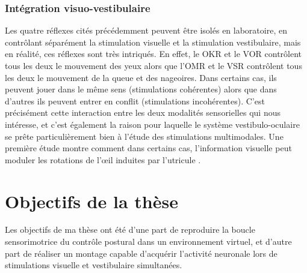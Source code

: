 \subsubsection{Intégration visuo-vestibulaire}

Les quatre réflexes cités précédemment peuvent être isolés en laboratoire, en contrôlant séparément la stimulation visuelle et la stimulation vestibulaire, mais en réalité, ces réflexes sont très intriqués. En effet, le OKR et le VOR contrôlent tous les deux le mouvement des yeux alors que l'OMR et le VSR contrôlent tous les deux le mouvement de la queue et des nageoires. Dans certains cas, ils peuvent jouer dans le même sens (stimulations cohérentes) alors que dans d'autres ils peuvent entrer en conflit (stimulations incohérentes). C'est précisément cette interaction entre les deux modalités sensorielles qui nous intéresse, et c'est également la raison pour laquelle le système vestibulo-oculaire se prête particulièrement bien à l'étude des stimulations multimodales. Une première étude montre comment dans certains cas, l'information visuelle peut moduler les rotations de l'œil induites par l'utricule \cite{bianco_tangential_2012}.


\section{Objectifs de la thèse}


Les objectifs de ma thèse ont été d'une part de reproduire la boucle sensorimotrice du contrôle postural dans un environnement virtuel, et d'autre part de réaliser un montage capable d'acquérir l'activité neuronale lors de stimulations visuelle et vestibulaire simultanées.